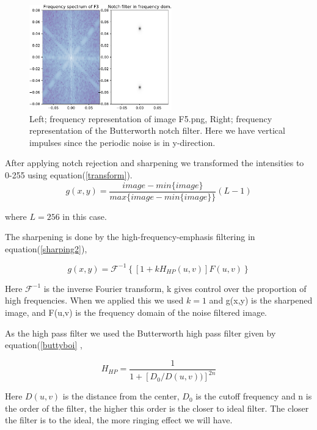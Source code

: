 {    \begin{figure}[!htb]
        {\centering
            \includegraphics[width=0.55\textwidth]{C7F3freq.pdf}
            \caption{Left; frequency representation of image F5.png, Right; frequency representation of the Butterworth notch filter. Here we have vertical impulses since the periodic noise is in y-direction.}
            \label{C7F3freq}
        \par}
        \end{figure}

    After applying notch rejection and sharpening we transformed the intensities to 0-255 using equation(\ref{transform}).
\begin{equation}
    g(x,y) = \frac{image-min\{image\}}{max\{image-min\{image\}\}}(L-1)
    \label{transform}
\end{equation}

where $L = 256$ in this case.

The sharpening is done by the high-frequency-emphasis filtering in equation(\ref{sharping2}),

\begin{equation}
    g(x,y) = \mathcal{F}^{-1}\left\lbrace[1 + kH_{HP}(u,v)]F(u,v) \right\rbrace
    \label{sharping2}
\end{equation}

Here $\mathcal{F}^{-1}$ is the inverse Fourier transform, k gives control over the proportion of high frequencies. When we applied this we used $k = 1$ and g(x,y) is the sharpened image, and F(u,v) is the frequency domain of the noise filtered image.


As the high pass filter we used the Butterworth high pass filter given by equation(\ref{buttyboi} ,

\begin{equation}
   H_{HP} = \frac{1}{1+[D_{0}/D(u,v))]^{2n}}
    \label{buttyboi}
\end{equation}

Here $D(u,v)$ is the distance from the center, $D_{0}$ is the cutoff frequency and n is the order of the filter, the higher this order is the closer to ideal filter. The closer the filter is to the ideal, the more ringing effect we will have.

}
